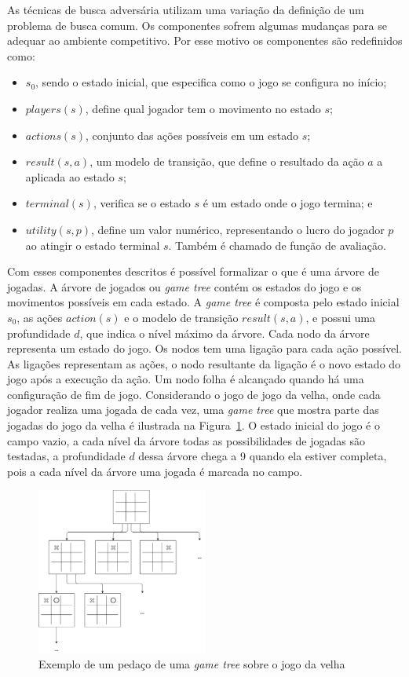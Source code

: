 As técnicas de busca adversária utilizam uma variação da definição de um problema de busca comum. 
Os componentes sofrem algumas mudanças para se adequar ao ambiente competitivo.
Por esse motivo os componentes são redefinidos como:

\begin{itemize}
	\item $s_{0}$, sendo o estado inicial, que especifica como o jogo se configura no início;
	\item $players(s)$, define qual jogador tem o movimento no estado $s$;
	\item $actions(s)$, conjunto das ações possíveis em um estado $s$;
	\item $result(s, a)$, um modelo de transição, que define o resultado da ação $a$ a aplicada ao estado $s$;
	\item $terminal(s)$, verifica se o estado $s$ é um estado onde o jogo termina; e
	\item $utility(s,p)$, define um valor numérico, representando o lucro do jogador $p$ ao atingir o estado terminal $s$. Também é chamado de função de avaliação.
\end{itemize}

Com esses componentes descritos é possível formalizar o que é uma árvore de jogadas. 
A árvore de jogados ou \textit{game tree} contém os estados do jogo e os movimentos possíveis em cada estado. 
A \textit{game tree} é composta pelo estado inicial $s_{0}$, as ações $action(s)$ e o modelo de transição $result(s, a)$, e possui uma profundidade $d$, que indica o nível máximo da árvore. 
Cada nodo da árvore representa um estado do jogo. 
Os nodos tem uma ligação para cada ação possível. As ligações representam as ações, o nodo resultante da ligação é o novo estado do jogo após a execução da ação.
Um nodo folha é alcançado quando há uma configuração de fim de jogo.
Considerando o jogo de jogo da velha, onde cada jogador realiza uma jogada de cada vez, uma \textit{game tree} que mostra parte das jogadas do jogo da velha é ilustrada na Figura~\ref{fig:jogodavelha}. 
O estado inicial do jogo é o campo vazio, a cada nível da árvore todas as possibilidades de jogadas são testadas, a profundidade $d$ dessa árvore chega a 9 quando ela estiver completa, pois a cada nível da árvore uma jogada é marcada no campo. 

\begin{figure}[ht]
	\centering
	\includegraphics[width=0.5\textwidth]{fig/jogodavelha.pdf}
	\caption{Exemplo de um pedaço de uma \textit{game tree} sobre o jogo da velha}
	\label{fig:jogodavelha}
\end{figure} 

